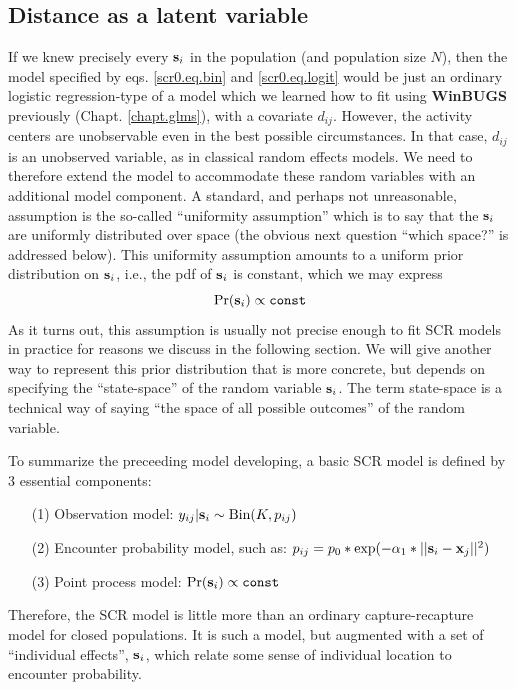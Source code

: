 \subsection{Distance as a latent variable}

If we knew precisely every ${\bf s}_{i}$ in the population (and
population size $N$), then the model specified by
eqs. \ref{scr0.eq.bin} and \ref{scr0.eq.logit} would be just an
ordinary logistic regression-type of a model which we learned how to
fit using {\bf WinBUGS} previously (Chapt. \ref{chapt.glms}), with a
covariate $d_{ij}$. However, the activity centers are unobservable
even in the best possible circumstances. In that case, $d_{ij}$ is an
unobserved variable, as in classical random effects models. We need to
therefore extend the model to accommodate these random variables with
an additional model component. A standard, and perhaps not
unreasonable, assumption is the so-called ``uniformity assumption''
which is to say that the ${\bf s}_{i}$ are uniformly distributed over
space (the obvious next question ``which space?'' is addressed below).
This uniformity assumption amounts to a uniform prior distribution on
${\bf s}_{i}$, i.e., the pdf of ${\bf s}_{i}$ is constant, which we
may express
\begin{equation}
	\Pr({\bf s}_{i}) \propto \mbox{\tt const}
\label{scr0.eq.sprior}
\end{equation}
 As it turns out, this assumption is usually not precise
enough to fit SCR models in practice for reasons we discuss in the
following section.  We will give another way to represent this prior
distribution that is more concrete, but depends on specifying the
``state-space'' of the random variable ${\bf s}_{i}$. The term
state-space is a technical way of saying ``the space of all possible
outcomes'' of the random variable.

To summarize the preceeding model developing, a basic SCR model is
defined by 3 essential components:
\begin{itemize}
\item[(1)] Observation model: $y_{ij}|{\bf s}_{i} \sim \mbox{Bin}(K, p_{ij})$
\item[(2)] Encounter probability model, such as: 
$p_{ij} = p_{0}*\exp(-\alpha_{1} *||{\bf s}_{i}-{\bf x}_{j}||^2)$
\item[(3)] Point process model: $\Pr({\bf s}_{i} ) \propto \mbox{\tt const}$
\end{itemize}
Therefore, the SCR model is little more than an ordinary
capture-recapture model for closed populations. It is such a model,
but augmented with a set of ``individual effects'', ${\bf s}_{i}$,
which relate some sense of individual location to encounter
probability. 

